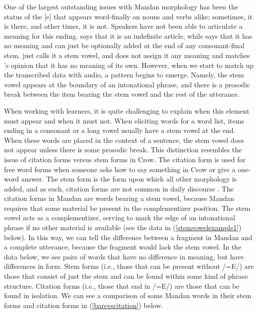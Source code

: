 One of the largest outstanding issues with Mandan morphology has been the status of the [e] that appears word-finally on nouns and verbs alike; sometimes, it is there, and other times, it is not. Speakers have not been able to articulate a meaning for this ending. \citet[26]{kennard1936} says that it is an indefinite article, while \citet[39]{hollow1970} says that it has no meaning and can just be optionally added at the end of any consonant-final stem. \citet[15]{mixco1997a} just calls it a stem vowel, and does not assign it any meaning and matches \citeauthor{hollow1970}'s opinion that it has no meaning of its own. However, when we start to match up the transcribed data with audio, a pattern begins to emerge. Namely, the stem vowel appears at the boundary of an intonational phrase, and there is a prosodic break between the item bearing the stem vowel and the rest of the utterance.

When working with learners, it is quite challenging to explain when this element must appear and when it must not. When eliciting words for a word list, items ending in a consonant or a long vowel usually have a stem vowel at the end. When these words are placed in the context of a sentence, the stem vowel does not appear unless there is some prosodic break. This distinction resembles the issue of citation forms versus stem forms in Crow. The citation form is used for free word forms when someone asks how to say something in Crow or give a one-word answer. The stem form is the form upon which all other morphology is added, and as such, citation forms are not common in daily discourse \citep[30]{graczyk2007}. The citation forms in Mandan are words bearing a stem vowel, because Mandan requires that some material be present in the complementizer position. The stem vowel acts as a complementizer, serving to mark the edge of an intonational phrase if no other material is available (see the data in (\ref{stemvowelexample1}) below). In this way, we can tell the difference between a fragment in Mandan and a complete utterance, because the fragment would lack the stem vowel. In the data below, we see pairs of words that have no difference in meaning, but have differences in form. Stem forms (i.e., those that can be present without /=E/) are those that consist of just the stem and can be found within some kind of phrase structure. Citation forms (i.e., those that end in /=E/) are those that can be found in isolation. We can see a comparison of some Mandan words in their stem forms and citation forms in (\ref{barevscitation}) below.

